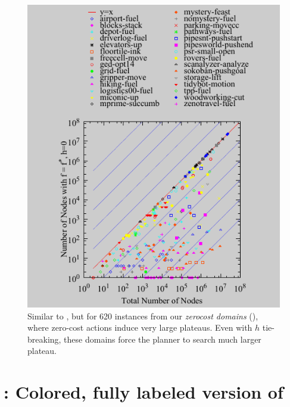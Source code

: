 \documentclass[10pt,letterpaper]{article}
\begin{document}
\begin{figure}[htb]
 \includegraphics{tables/aaai16-frontier/zerocost/lmcut_frontier-front.pdf}
 \caption{Similar to , but for 620 instances from our 
 \emph{zerocost domains} (),
 where zero-cost actions induce very large plateaus.
 Even with $h$ tie-breaking, these domains force the planner
 to search much larger plateau.
 }
 \label{plateau-zerocost-full}
\end{figure}

\newpage
\section{: Colored, fully labeled version of }
\end{document}
